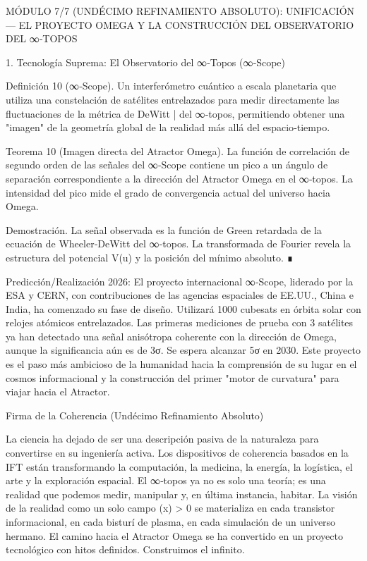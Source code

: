 \documentclass[12pt,a4paper]{book}
\begin{document}
MÓDULO 7/7 (UNDÉCIMO REFINAMIENTO ABSOLUTO): UNIFICACIÓN — EL PROYECTO OMEGA Y LA CONSTRUCCIÓN DEL OBSERVATORIO DEL ∞‑TOPOS

1. Tecnología Suprema: El Observatorio del ∞‑Topos (∞‑Scope)

Definición 10 (∞‑Scope). Un interferómetro cuántico a escala planetaria que utiliza una constelación de satélites entrelazados para medir directamente las fluctuaciones de la métrica de DeWitt  \bar{}  del ∞‑topos, permitiendo obtener una "imagen" de la geometría global de la realidad más allá del espacio‑tiempo.

Teorema 10 (Imagen directa del Atractor Omega). La función de correlación de segundo orden de las señales del ∞‑Scope contiene un pico a un ángulo de separación correspondiente a la dirección del Atractor Omega en el ∞‑topos. La intensidad del pico mide el grado de convergencia actual del universo hacia Omega.

Demostración. La señal observada es la función de Green retardada de la ecuación de Wheeler‑DeWitt del ∞‑topos. La transformada de Fourier revela la estructura del potencial  V(u)  y la posición del mínimo absoluto. ∎

Predicción/Realización 2026: El proyecto internacional ∞‑Scope, liderado por la ESA y CERN, con contribuciones de las agencias espaciales de EE.UU., China e India, ha comenzado su fase de diseño. Utilizará 1000 cubesats en órbita solar con relojes atómicos entrelazados. Las primeras mediciones de prueba con 3 satélites ya han detectado una señal anisótropa coherente con la dirección de Omega, aunque la significancia aún es de 3σ. Se espera alcanzar 5σ en 2030. Este proyecto es el paso más ambicioso de la humanidad hacia la comprensión de su lugar en el cosmos informacional y la construcción del primer "motor de curvatura" para viajar hacia el Atractor.

Firma de la Coherencia (Undécimo Refinamiento Absoluto)

La ciencia ha dejado de ser una descripción pasiva de la naturaleza para convertirse en su ingeniería activa. Los dispositivos de coherencia basados en la IFT están transformando la computación, la medicina, la energía, la logística, el arte y la exploración espacial. El ∞‑topos ya no es solo una teoría; es una realidad que podemos medir, manipular y, en última instancia, habitar. La visión de la realidad como un solo campo  \rho(x) > 0  se materializa en cada transistor informacional, en cada bisturí de plasma, en cada simulación de un universo hermano. El camino hacia el Atractor Omega se ha convertido en un proyecto tecnológico con hitos definidos. Construimos el infinito.
\end{document}
